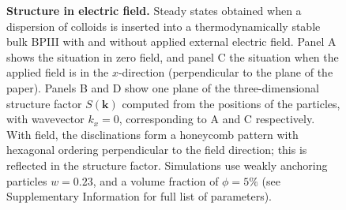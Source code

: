 \documentclass[12pt]{article}
\begin{document}
\begin{figure}
\begin{center}
\end{center}
\caption{\textbf{Structure in electric field.}
Steady states obtained when a dispersion of colloids is inserted
into a thermodynamically stable bulk BPIII with and without applied
external electric field. Panel A shows the situation in zero field, and panel
C the situation when the applied field is in the $x$-direction
(perpendicular to the plane of the paper). Panels B and D show one
plane of the three-dimensional structure factor $S(\mathbf{k})$ computed
from the positions of the particles, with wavevector $k_x = 0$, corresponding
to A and C respectively. With field, the disclinations form a honeycomb
pattern with hexagonal ordering perpendicular to the field direction;
this is reflected in the structure factor.
Simulations use weakly anchoring particles $w=0.23$, and a volume
fraction of $\phi=5\%$ (see Supplementary Information for full list of
parameters). }
\end{figure}
\end{document}
